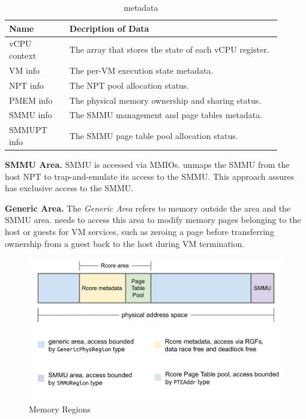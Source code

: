 \begin{table}
\begin{tabular}{ |p{0.2\linewidth}|p{0.7\linewidth}| }
\hline
\footnotesize \textbf{Name} & \footnotesize \textbf{Decription of Data} \\ \hline
\footnotesize vCPU context & \footnotesize The array that stores the state of each vCPU register. \\ \hline
\footnotesize VM info & \footnotesize The per-VM execution state metadata. \\ \hline
\footnotesize NPT info & \footnotesize The NPT pool allocation status. \\ \hline
\footnotesize PMEM info & \footnotesize The physical memory ownership and sharing status. \\ \hline
\footnotesize SMMU info & \footnotesize The SMMU management and page tables metadata. \\ \hline
\footnotesize SMMUPT info & \footnotesize The SMMU page table pool allocation status. \\ \hline
\end{tabular}
\vspace{0.2cm}
\caption{\rustcore{} metadata}
\label{tab:metadata}
\vspace{-0.4cm}
\end{table}

\textbf{SMMU Area.}
SMMU is accessed via MMIOs. \rustcore{} unmaps the SMMU
from the host NPT to trap-and-emulate its access to the SMMU. This
approach assures \rustcore{} has exclusive access to the SMMU.

\textbf{Generic Area.}
The \textit{Generic Area} refers to memory outside the \rustcore{} area and the SMMU area.
\rustcore{} needs to access this area to modify memory pages
belonging to the host or guests for VM services, such as zeroing a page
before transferring ownership from a guest back to the host during VM termination.

\begin{figure}[ht]
\centering
\includegraphics[width=1.00\textwidth]{figures/regions.pdf}
\caption{Memory Regions}
\label{fig:regions}
\end{figure}

